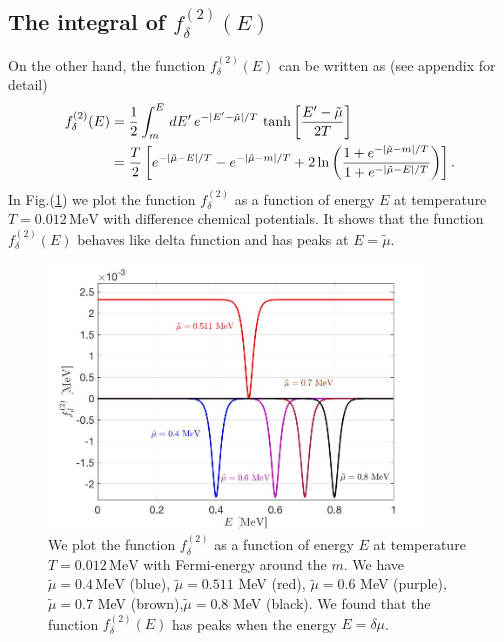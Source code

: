 \documentclass[sn-mathphys,Numbered]{sn-jnl}
\theoremstyle{thmstyleone}%
\theoremstyle{thmstyletwo}%
\theoremstyle{thmstylethree}%
\begin{document}
\subsection{The integral of $f^{(2)}_\delta(E)$}
On the other hand, the function $f^{(2)}_\delta(E)$ can be written as (see appendix for detail)
\begin{align}
f^{(2)}_\delta(E)&=\frac{1}{2}\int^{E}_{m}\,dE^\prime\,e^{-|E^\prime-\tilde\mu|/T}\,\tanh\bigg[\frac{E^\prime-\tilde\mu}{2T}\bigg]\notag\\
&=\frac{T}{2}\left[e^{-|\tilde\mu-E|/T}-e^{-|\tilde\mu-m|/T}+2\ln{\left(\frac{1+e^{-|\tilde\mu-m|/T}}{1+e^{-|\tilde\mu-E|/T}}\right)}\right].
\end{align}
In Fig.(\ref{f_delta002_graph}) we plot the function $f_\delta^{(2)}$ as a function of energy $E$ at temperature $T=0.012\,\mathrm{MeV}$ with difference chemical potentials. It shows that the function $f^{(2)}_\delta(E)$ behaves like delta function and has  peaks at $E=\tilde\mu$.
\begin{figure}[h]
\begin{center}
\includegraphics[width=0.9\textwidth]{./plot/f_delta002}
\caption{We plot the function $f^{(2)}_\delta$ as a function of energy $E$ at temperature $T=0.012\,\mathrm{MeV}$ with Fermi-energy around the $m$. We have $\tilde\mu=0.4\,\mathrm{MeV}$ (blue), $\tilde\mu=0.511$ MeV (red), $\tilde\mu=0.6$ MeV (purple), $\tilde\mu=0.7$ MeV (brown),$\tilde\mu=0.8$ MeV (black). We found that the function $f^{(2)}_\delta(E)$ has peaks when the energy  $E=\delta\mu$. }
\label{f_delta002_graph}
\end{center}
\end{figure}
\end{document}
